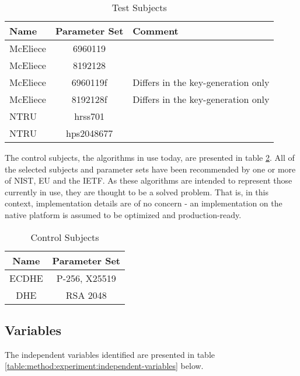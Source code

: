 \begin{table}[H]
    \centering
    \begin{tabular}{l|c|p{4cm}}
        Name & Parameter Set & Comment \\
        \hline
        McEliece & 6960119 & \\
        McEliece & 8192128 & \\
        McEliece & 6960119f & Differs in the key-generation only \\
        McEliece & 8192128f & Differs in the key-generation only\\
        NTRU & hrss701 & \\
        NTRU & hps2048677 & \\
    \end{tabular}
    \caption{Test Subjects}
    \label{table:method:experiment:test-subjects}
\end{table}

The control subjects, the algorithms in use today, are presented in table \ref{table:method:experiment:control-subjects}. All of the selected subjects and parameter sets have been recommended by one or more of NIST, EU and the IETF. As these algorithms are intended to represent those currently in use, they are thought to be a solved problem. That is, in this context, implementation details are of no concern - an implementation on the native platform is assumed to be optimized and production-ready.

\begin{table}[H]
    \centering
    \begin{tabular}{c|c}
        Name & Parameter Set \\
        \hline
        ECDHE & P-256, X25519 \\
        DHE & RSA 2048 \\
    \end{tabular}
    \caption{Control Subjects}
    \label{table:method:experiment:control-subjects}
\end{table}

\subsection{Variables}

The independent variables identified are presented in table \ref{table:method:experiment:independent-variables} below.

